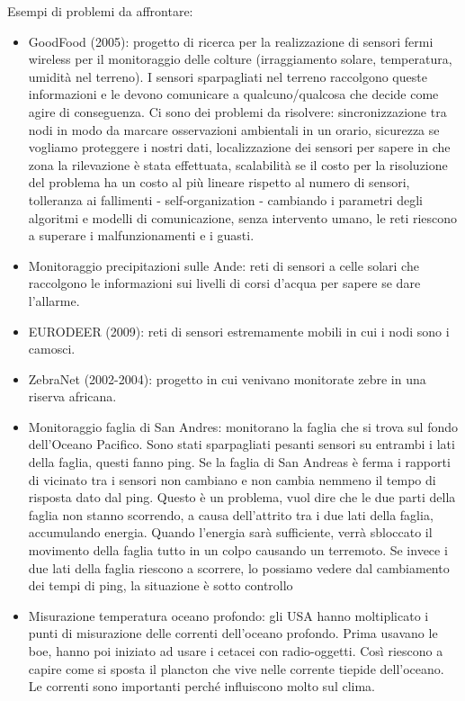 \documentclass[12pt,italian]{report}
\begin{document}
\noindent Esempi di problemi da affrontare: 
\begin{itemize}
    \item GoodFood (2005): progetto di ricerca per la realizzazione di sensori fermi wireless per il monitoraggio delle colture (irraggiamento solare, temperatura, umidità nel terreno). I sensori sparpagliati nel terreno raccolgono queste informazioni e le devono comunicare a qualcuno/qualcosa che decide come agire di conseguenza.
    Ci sono dei problemi da risolvere: sincronizzazione tra nodi in modo da marcare osservazioni ambientali in un orario, sicurezza se vogliamo proteggere i nostri dati, localizzazione dei sensori per sapere in che zona la rilevazione è stata effettuata, scalabilità se il costo per la risoluzione del problema ha un costo al più lineare rispetto al numero di sensori, tolleranza ai fallimenti - self-organization - cambiando i parametri degli algoritmi e modelli di comunicazione, senza intervento umano, le reti riescono a superare i malfunzionamenti e i guasti. 
    \item Monitoraggio precipitazioni sulle Ande:  reti di sensori a celle solari che raccolgono le informazioni sui livelli di corsi d'acqua per sapere se dare l'allarme. 
    \item EURODEER (2009): reti di sensori estremamente mobili in cui i nodi sono i camosci.
    \item ZebraNet (2002-2004): progetto in cui venivano monitorate zebre in una riserva africana.
    \item Monitoraggio faglia di San Andres: monitorano la faglia che si trova sul fondo dell'Oceano Pacifico. Sono stati sparpagliati pesanti sensori su entrambi i lati della faglia, questi fanno ping. Se la faglia di San Andreas è ferma i rapporti di vicinato tra i sensori non cambiano e non cambia nemmeno il tempo di risposta dato dal ping. Questo è un problema, vuol dire che le due parti della faglia non stanno scorrendo, a causa dell'attrito tra i due lati della faglia, accumulando energia. Quando l'energia sarà sufficiente, verrà sbloccato il movimento della faglia tutto in un colpo causando un terremoto. Se invece i due lati della faglia riescono a scorrere, lo possiamo vedere dal cambiamento dei tempi di ping, la situazione è sotto controllo
    \item Misurazione temperatura oceano profondo: gli USA hanno moltiplicato i punti di misurazione delle correnti dell'oceano profondo. Prima usavano le boe, hanno poi iniziato ad usare i cetacei con radio-oggetti. Così riescono a capire come si sposta il plancton che vive nelle corrente tiepide dell'oceano. Le correnti sono importanti perché influiscono molto sul clima.  

\end{itemize}
\end{document}
